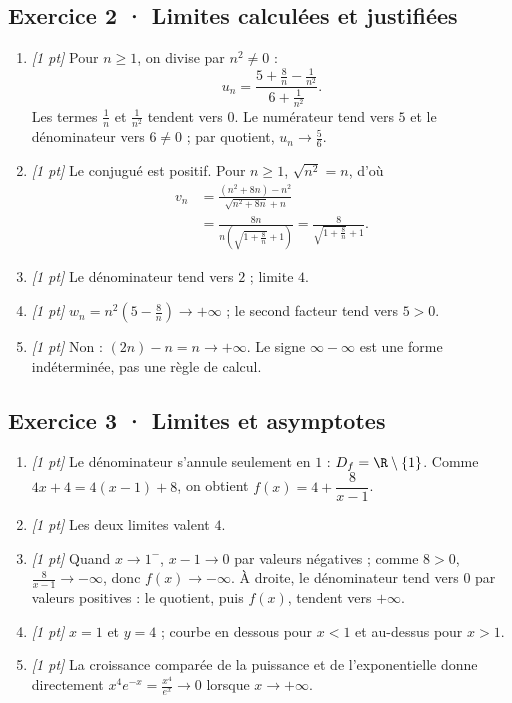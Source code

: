 \subsection*{Exercice 2 · Limites calculées et justifiées}\begin{enumerate}

\item \textit{[1 pt]} Pour $n\ge1$, on divise par $n^2\ne0$ :
\[u_n=\frac{5+\frac{8}{n}-\frac{1}{n^2}}{6+\frac{1}{n^2}}.\]
Les termes $\frac{1}{n}$ et $\frac{1}{n^2}$ tendent vers $0$. Le numérateur tend vers $5$ et le dénominateur vers $6\ne0$ ; par quotient, $u_n\to\frac{5}{6}$.

\item \textit{[1 pt]} Le conjugué est positif. Pour $n\ge1$, $\sqrt{n^2}=n$, d'où
\[\begin{aligned}v_n&=\frac{(n^2+8n)-n^2}{\sqrt{n^2+8n}+n}\\&=\frac{8n}{n(\sqrt{1+\frac{8}{n}}+1)}=\frac{8}{\sqrt{1+\frac{8}{n}}+1}.\end{aligned}\]

\item \textit{[1 pt]} Le dénominateur tend vers $2$ ; limite $4$.

\item \textit{[1 pt]} $w_n=n^2(5-\frac{8}{n})\to+\infty$ ; le second facteur tend vers $5>0$.

\item \textit{[1 pt]} Non : $(2n)-n=n\to+\infty$. Le signe $\infty-\infty$ est une forme indéterminée, pas une règle de calcul.

\end{enumerate}

\subsection*{Exercice 3 · Limites et asymptotes}\begin{enumerate}

\item \textit{[1 pt]} Le dénominateur s'annule seulement en $1$ : $D_f=\R\setminus\{1\}$. Comme $4x+4=4(x-1)+8$, on obtient $f(x)=4+\dfrac{8}{x-1}$.

\item \textit{[1 pt]} Les deux limites valent $4$.

\item \textit{[1 pt]} Quand $x\to 1^-$, $x-1\to0$ par valeurs négatives ; comme $8>0$, $\frac{8}{x-1}\to-\infty$, donc $f(x)\to-\infty$. À droite, le dénominateur tend vers $0$ par valeurs positives : le quotient, puis $f(x)$, tendent vers $+\infty$.

\item \textit{[1 pt]} $x=1$ et $y=4$ ; courbe en dessous pour $x<1$ et au-dessus pour $x>1$.

\item \textit{[1 pt]} La croissance comparée de la puissance et de l'exponentielle donne directement $x^4e^{-x}=\frac{x^4}{e^x}\to0$ lorsque $x\to+\infty$.

\end{enumerate}

